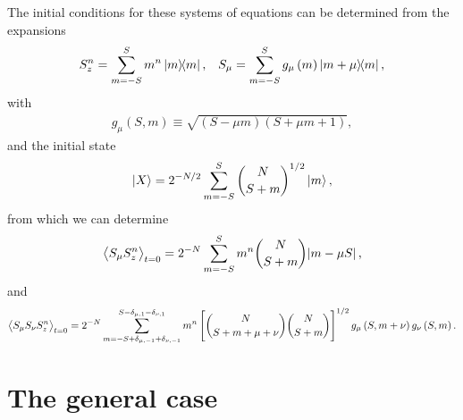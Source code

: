 \documentclass[aps,notitlepage,nofootinbib,11pt]{revtex4-1}
\newcommand{\p}[1]{\left(#1\right)} %
\renewcommand{\sp}[1]{\left[#1\right]} %
\newcommand{\bk}{\Braket} %
\newcommand{\1}{\mathds{1}}
\begin{document}
The initial conditions for these systems of equations can be
determined from the expansions
\begin{align}
  S_z^n = \sum_{m=-S}^S m^n \op{m},
  &&
  S_\mu = \sum_{m=-S}^S g_\mu\p{m} \op{m+\mu}{m},
\end{align}
with
\begin{align}
  g_\mu\p{S,m} \equiv \sqrt{\p{S-\mu m}\p{S+\mu m+1}},
  \label{eq:transverse_elem}
\end{align}
and the initial state
\begin{align}
  \ket{X} = 2^{-N/2} \sum_{m=-S}^S { N \choose S+m }^{1/2} \ket{m},
\end{align}
from which we can determine
\begin{align}
  \bk{S_\mu S_z^n}_{t=0}
  = 2^{-N} \sum_{m=-S}^S m^n { N \choose S+m } \abs{m - \mu S},
\end{align}
and
\begin{align}
  \bk{S_\mu S_\nu S_z^n}_{t=0}
  = 2^{-N} \sum_{m=-S+\delta_{\mu,-1}+\delta_{\nu,-1}}
  ^{S-\delta_{\mu,1}-\delta_{\nu,1}}
  m^n \sp{{ N \choose S+m+\mu+\nu } { N \choose S+m }}^{1/2}
  g_\mu\p{S,m+\nu} g_\nu\p{S,m}.
\end{align}


\section{The general case}
\end{document}
